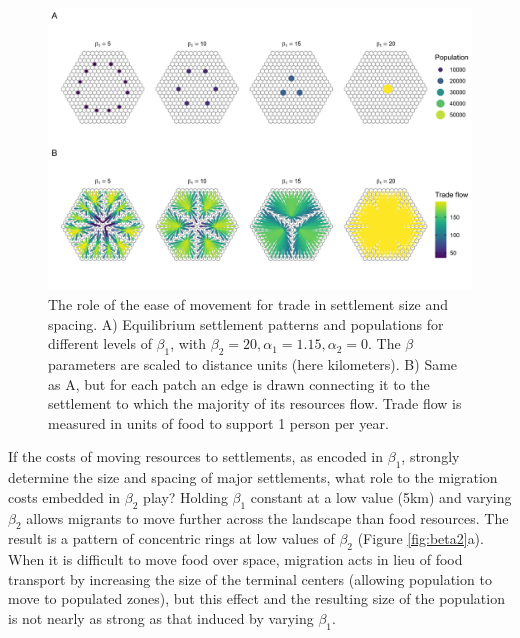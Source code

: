\documentclass{article}
\begin{document}
\begin{figure}
    \centering
    \includegraphics[width = \linewidth]{images/beta1.png}
    \caption[The role of the ease of movement for trade in settlement size and spacing]{The role of the ease of movement for trade in settlement size and spacing. A) Equilibrium settlement patterns and populations for different levels of $\beta_1$, with $\beta_2 = 20, \alpha_1 = 1.15, \alpha_2 = 0$. The $\beta$ parameters are scaled to distance units (here kilometers). B) Same as A, but for each patch an edge is drawn connecting it to the settlement to which the majority of its resources flow. Trade flow is measured in units of food to support 1 person per year.}
    \label{fig:beta1}
\end{figure}


If the costs of moving resources to settlements, as encoded in $\beta_1$, strongly determine the size and spacing of major settlements, what role to the migration costs embedded in $\beta_2$ play? Holding $\beta_1$ constant at a low value (5km) and varying $\beta_2$ allows migrants to move further across the landscape than food resources. The result is a pattern of concentric rings at low values of $\beta_2$ (Figure \ref{fig:beta2}a). When it is difficult to move food over space, migration acts in lieu of food transport by increasing the size of the terminal centers (allowing population to move to populated zones), but this effect and the resulting size of the population is not nearly as strong as that induced by varying $\beta_1$. 
\end{document}
